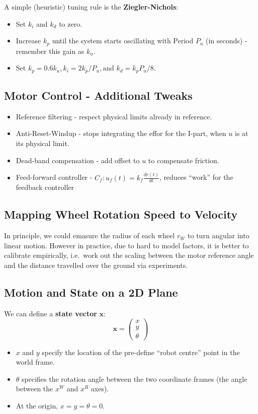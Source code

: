 \documentclass[11pt]{article}
\begin{document}
A simple (heuristic) tuning rule is the \textbf{Ziegler-Nichols}:
\begin{itemize}
  \item Set $k_i$ and $k_d$ to zero.
  \item Increase $k_p$ until the system starts oscillating with Period $P_u$ (in seconds) - remember this gain as $k_u$.
  \item Set $k_p = 0.6k_u, k_i = 2k_p/P_u, \text{and } k_d = k_pP_u/8$.
\end{itemize}

\subsection{Motor Control - Additional Tweaks}
\begin{itemize}
  \item Reference filtering - respect physical limits already in reference.
  \item Anti-Reset-Windup - stops integrating the effor for the I-part, when $u$ is at its physical limit.
  \item Dead-band compensation - add offset to $u$ to compensate friction.
  \item Feed-forward controller - $C_f : u_f(t) = k_f \frac{dr(t)}{dt}$, reduces ``work'' for the feedback controller
\end{itemize}

\subsection{Mapping Wheel Rotation Speed to Velocity}
In principle, we could emasure the radius of each wheel $r_W$ to turn angular into linear motion.
However in practice, due to hard to model factors, it is better to calibrate empirically, i.e.\ work out the scaling between the motor reference angle and the distance travelled over the ground via experiments.

\subsection{Motion and State on a 2D Plane}
We can define a \textbf{state vector} $\textbf{x}$:
\[
  \textbf{x} = 
  \begin{pmatrix}
    x \\ y \\ \theta
  \end{pmatrix}
\]
\begin{itemize}
  \item $x$ and $y$ specify the location of the pre-define ``robot centre'' point in the world frame.
  \item $\theta$ specifies the rotation angle between the two coordinate frames (the angle between the $x^W$ and $x^R$ axes).
  \item At the origin, $x = y = \theta = 0$.
\end{itemize}
\end{document}
